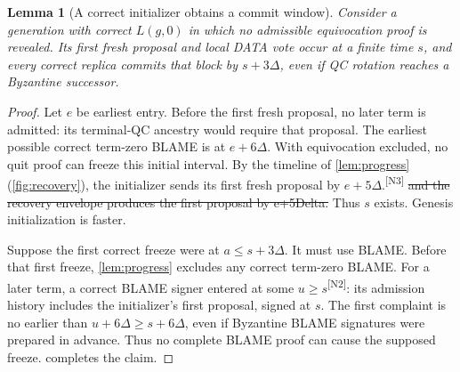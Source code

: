 \documentclass[11pt,a4paper]{article}
\newcommand{\NEW}[1]{{\color{diffNew}#1}}
\newcommand{\DEL}[1]{{\color{diffDel}\sout{#1}}}
\newcommand{\CH}[1]{\textsuperscript{\color{diffNew}\sffamily\scriptsize[#1]}}
\newcommand{\NEW}[1]{#1}
\newcommand{\DEL}[1]{}
\newcommand{\CH}[1]{}
\newtheorem{lemma}[lemma]{Lemma}
\begin{document}
\begin{lemma}[A correct initializer obtains a commit window]
\label{lem:initializer}
Consider a generation with correct $L(g,0)$ in which no admissible
equivocation proof is revealed. Its first fresh proposal and local DATA
vote occur at a finite time $s$, and every correct replica commits that block by
$s+3\Delta$, even if QC rotation reaches a Byzantine successor.
\end{lemma}
\begin{proof}
Let $e$ be earliest entry. Before the first fresh proposal, no later
term is admitted: its terminal-QC ancestry would require that proposal.
The earliest possible correct term-zero BLAME is at $e+6\Delta$.
With equivocation excluded, no quit proof can freeze this initial interval.
\NEW{By the timeline of \cref{lem:progress} (\cref{fig:recovery}), the
initializer sends its first fresh proposal by $e+5\Delta$.}\CH{N3}
\DEL{and the recovery envelope produces the first proposal by
e+5Delta.} Thus $s$ exists. Genesis initialization is faster.

Suppose the first correct freeze were at $a\le s+3\Delta$.
It must use BLAME. Before that first freeze, \cref{lem:progress} excludes
any correct term-zero BLAME. For a later term, a correct BLAME signer
entered at some $u\ge s$\CH{N2}: its admission history includes the
initializer's first proposal, signed at $s$. The first complaint is no
earlier than $u+6\Delta\ge s+6\Delta$, even if Byzantine \NEW{BLAME
signatures} were prepared in advance. Thus no complete BLAME proof can
cause the supposed freeze.  completes the claim.
\end{proof}
\end{document}
